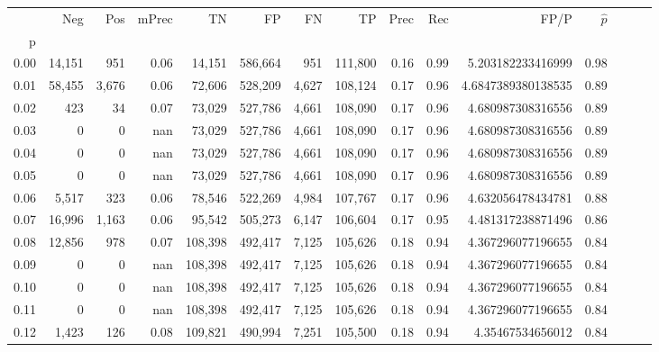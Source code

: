 \begin{tabular}{rrrrrrrrrrrrrrr}
\toprule
{} &     Neg &     Pos & mPrec &       TN &       FP &       FN &       TP &  Prec &   Rec &                 FP/P & $\hat{p}$ \\
p    &         &         &       &          &          &          &          &       &       &                      &           \\
\midrule
0.00 &  14,151 &     951 &  0.06 &   14,151 &  586,664 &      951 &  111,800 &  0.16 &  0.99 &    5.203182233416999 &      0.98 \\
0.01 &  58,455 &   3,676 &  0.06 &   72,606 &  528,209 &    4,627 &  108,124 &  0.17 &  0.96 &   4.6847389380138535 &      0.89 \\
0.02 &     423 &      34 &  0.07 &   73,029 &  527,786 &    4,661 &  108,090 &  0.17 &  0.96 &    4.680987308316556 &      0.89 \\
0.03 &       0 &       0 &   nan &   73,029 &  527,786 &    4,661 &  108,090 &  0.17 &  0.96 &    4.680987308316556 &      0.89 \\
0.04 &       0 &       0 &   nan &   73,029 &  527,786 &    4,661 &  108,090 &  0.17 &  0.96 &    4.680987308316556 &      0.89 \\
0.05 &       0 &       0 &   nan &   73,029 &  527,786 &    4,661 &  108,090 &  0.17 &  0.96 &    4.680987308316556 &      0.89 \\
0.06 &   5,517 &     323 &  0.06 &   78,546 &  522,269 &    4,984 &  107,767 &  0.17 &  0.96 &    4.632056478434781 &      0.88 \\
0.07 &  16,996 &   1,163 &  0.06 &   95,542 &  505,273 &    6,147 &  106,604 &  0.17 &  0.95 &    4.481317238871496 &      0.86 \\
0.08 &  12,856 &     978 &  0.07 &  108,398 &  492,417 &    7,125 &  105,626 &  0.18 &  0.94 &    4.367296077196655 &      0.84 \\
0.09 &       0 &       0 &   nan &  108,398 &  492,417 &    7,125 &  105,626 &  0.18 &  0.94 &    4.367296077196655 &      0.84 \\
0.10 &       0 &       0 &   nan &  108,398 &  492,417 &    7,125 &  105,626 &  0.18 &  0.94 &    4.367296077196655 &      0.84 \\
0.11 &       0 &       0 &   nan &  108,398 &  492,417 &    7,125 &  105,626 &  0.18 &  0.94 &    4.367296077196655 &      0.84 \\
0.12 &   1,423 &     126 &  0.08 &  109,821 &  490,994 &    7,251 &  105,500 &  0.18 &  0.94 &     4.35467534656012 &      0.84 \\

\end{tabular}
